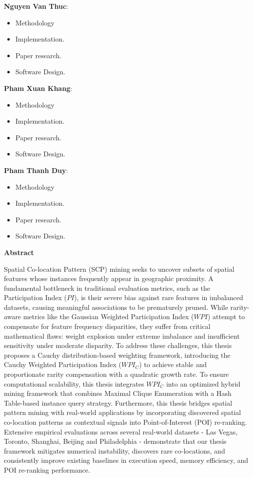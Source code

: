 \documentclass[12pt, letterpaper]{template}
\theoremstyle{definition}
\begin{document}
\textbf{Nguyen Van Thuc}:
\begin{itemize}
    \item Methodology
    \item Implementation.
    \item Paper research.
    \item Software Design.
\end{itemize}

\textbf{Pham Xuan Khang}:
\begin{itemize}
    \item Methodology
    \item Implementation.
    \item Paper research.
    \item Software Design.


\end{itemize}

\textbf{Pham Thanh Duy}:
\begin{itemize}
    \item Methodology
    \item Implementation.
    \item Paper research.
     \item Software Design.

\end{itemize}
\clearpage



\textbf{Abstract}

Spatial Co-location Pattern (SCP) mining seeks to uncover subsets of spatial features whose instances frequently appear in geographic proximity. A fundamental bottleneck in traditional evaluation metrics, such as the Participation Index ($PI$), is their severe bias against rare features in imbalanced datasets, causing meaningful associations to be prematurely pruned. While rarity-aware metrics like the Gaussian Weighted Participation Index ($WPI$) attempt to compensate for feature frequency disparities, they suffer from critical mathematical flaws: weight explosion under extreme imbalance and insufficient sensitivity under moderate disparity. To address these challenges, this thesis proposes a Cauchy distribution-based weighting framework, introducing the Cauchy Weighted Participation Index ($WPI_C$) to achieve stable and proportionate rarity compensation with a quadratic growth rate. To ensure computational scalability, this thesis integrates $WPI_C$ into an optimized hybrid mining framework that combines Maximal Clique Enumeration with a Hash Table-based instance query strategy. Furthermore, this thesis bridges spatial pattern mining with real-world applications by incorporating discovered spatial co-location patterns as contextual signals into Point-of-Interest (POI) re-ranking. Extensive empirical evaluations across several real-world datasets - Las Vegas, Toronto, Shanghai, Beijing and Philadelphia - demonstrate that our thesis framework mitigates numerical instability, discovers rare co-locations, and consistently improve existing baselines in execution speed, memory efficiency, and POI re-ranking performance.
\end{document}
